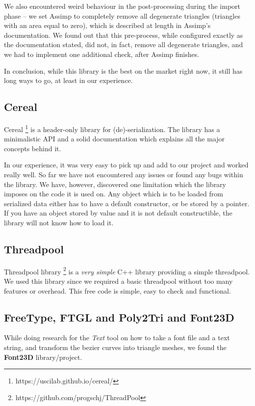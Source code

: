 We also encountered weird behaviour in the post-processing during the import phase -- we set Assimp to completely remove all degenerate triangles (triangles with an area equal to zero), which is described at length in Assimp's documentation. We found out that this pre-process, while configured exactly as the documentation stated, did not, in fact, remove all degenerate triangles, and we had to implement one additional check, after Assimp finishes.

In conclusion, while this library is the best on the market right now, it still has long ways to go, at least in our experience.

\subsection{Cereal}

Cereal \footnote{https://uscilab.github.io/cereal/} is a header-only library for (de)-serialization. The library has a minimalistic API and a solid documentation which explains all the major concepts behind it.

In our experience, it was very easy to pick up and add to our project and worked really well. So far we have not encountered any issues or found any bugs within the library. We have, however, discovered one limitation which the library imposes on the code it is used on. Any object which is to be loaded from serialized data either has to have a default constructor, or be stored by a pointer. If you have an object stored by value and it is not default constructible, the library will not know how to load it.

\subsection{Threadpool}

Threadpool library \footnote{https://github.com/progschj/ThreadPool} is a \emph{very simple} C++ library providing a simple threadpool. We used this library since we required a basic threadpool without too many features or overhead. This free code is simple, easy to check and functional.

\subsection{FreeType, FTGL and Poly2Tri and Font23D}

While doing research for the \textit{Text} tool on how to take a font file and a text string, and transform the bezier curves into triangle meshes, we found the \textbf{Font23D} library/project.

